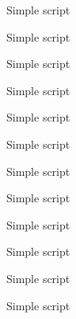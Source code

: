 \begin{frame}{Simple script}
\end{frame}
\begin{frame}{Simple script}
\end{frame}
\begin{frame}{Simple script}
\end{frame}
\begin{frame}{Simple script}
\end{frame}
\begin{frame}{Simple script}
\end{frame}
\begin{frame}{Simple script}
\end{frame}
\begin{frame}{Simple script}
\end{frame}
\begin{frame}{Simple script}
\end{frame}
\begin{frame}{Simple script}
\end{frame}
\begin{frame}{Simple script}
\end{frame}
\begin{frame}{Simple script}
\end{frame}
\begin{frame}{Simple script}
\end{frame}
